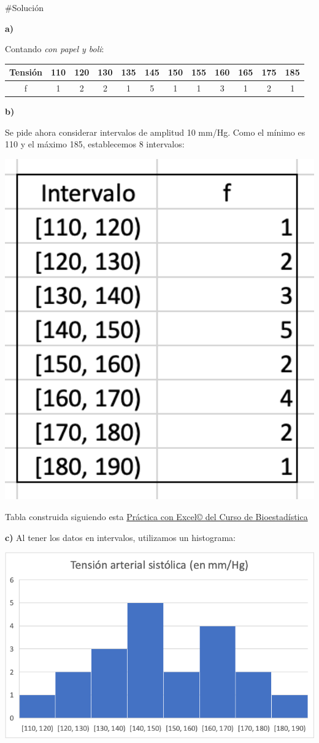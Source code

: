 \documentclass[
]{book}
\begin{document}
\#Solución

\textbf{a)}

Contando \emph{con papel y boli}:

\begin{longtable}[]{@{}cccccccccccc@{}}
\toprule
Tensión & 110 & 120 & 130 & 135 & 145 & 150 & 155 & 160 & 165 & 175 & 185\tabularnewline
\midrule
\endhead
f & 1 & 2 & 2 & 1 & 5 & 1 & 1 & 3 & 1 & 2 & 1\tabularnewline
\bottomrule
\end{longtable}

\textbf{b)}

Se pide ahora considerar intervalos de amplitud 10 mm/Hg. Como el mínimo es 110 y el máximo 185, establecemos 8 intervalos:

\includegraphics[width=5.28in]{img/1_6}

Tabla construida siguiendo esta \href{https://1fjmanzano.github.io/bioestadistica/tablas-de-frecuencias.html\#tablas-de-frecuencias-pr\%C3\%A1ctica-3-con-excel}{Práctica con Excel© del Curso de Bioestadística}

\textbf{c)} Al tener los datos en intervalos, utilizamos un histograma:

\includegraphics[width=10.03in]{img/1_7}
\end{document}
